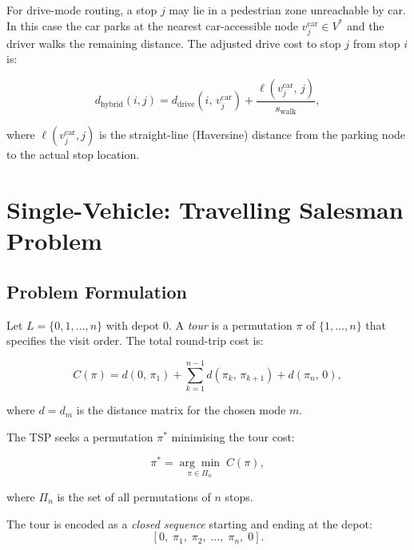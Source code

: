 \documentclass[12pt, a4paper]{article}
\theoremstyle{definition}
\begin{document}
For drive-mode routing, a stop $j$ may lie in a pedestrian zone unreachable
by car.  In this case the car parks at the nearest car-accessible node
$v_j^{\text{car}} \in V^*$ and the driver walks the remaining distance.
The adjusted drive cost to stop $j$ from stop $i$ is:

\begin{equation}
  \label{eq:hybrid}
  d_{\text{hybrid}}(i, j) = d_{\text{drive}}(i,\, v_j^{\text{car}})
    + \frac{\ell(v_j^{\text{car}},\, j)}{s_{\text{walk}}},
\end{equation}

\noindent where $\ell(v_j^{\text{car}}, j)$ is the straight-line (Haversine)
distance from the parking node to the actual stop location.

\section{Single-Vehicle: Travelling Salesman Problem}

\subsection{Problem Formulation}

Let $L = \{0, 1, \ldots, n\}$ with depot $0$.  A \emph{tour} is a permutation
$\pi$ of $\{1, \ldots, n\}$ that specifies the visit order.  The total
round-trip cost is:

\begin{equation}
  \label{eq:tsp_cost}
  C(\pi) = d(0,\, \pi_1)
    + \sum_{k=1}^{n-1} d(\pi_k,\, \pi_{k+1})
    + d(\pi_n,\, 0),
\end{equation}

\noindent where $d = d_m$ is the distance matrix for the chosen mode $m$.

The TSP seeks a permutation $\pi^*$ minimising the tour cost:

\begin{equation}
  \label{eq:tsp}
  \pi^* = \underset{\pi \in \Pi_n}{\arg\min}\; C(\pi),
\end{equation}

\noindent where $\Pi_n$ is the set of all permutations of $n$ stops.

The tour is encoded as a \emph{closed sequence} starting and ending at the
depot:
\[
  [0,\; \pi_1,\; \pi_2,\; \ldots,\; \pi_n,\; 0].
\]
\end{document}
